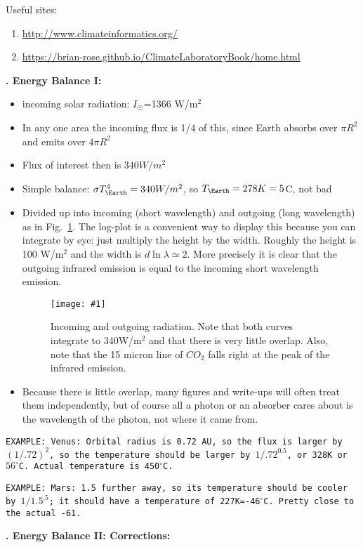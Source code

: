 \documentclass[11pt]{book}
\newcommand{\sfig}[2]{
\texttt{[image: \#1]}
        }
\newcommand{\Spng}[2]{
   \begin{figure}[thbp]
   \begin{center}
    \sfig{../Figures/#1.png}{0.7\columnwidth}
    \caption{{\small #2}}
    \label{fig:#1}
     \end{center}
   \end{figure}
}
\newcommand{\rf}[1]{\ref{fig:#1}}
\newcommand\example[1]{{\tt EXAMPLE: #1}}
\newcommand\bei{\begin{itemize}}
\newcommand\eei{\end{itemize}}
\newcommand\bee{\begin{enumerate}}
\newcommand\eee{\end{enumerate}}
\newcounter{lectureno}
\newcounter{secno}
\newcommand\lsection[1]{
\addtocounter{secno}{1}
{\bf \arabic{lectureno}.\alph{secno} #1:}}
\begin{document}
Useful sites:
\bee
\item\href{Cimateinfomatics}{http://www.climateinformatics.org/}
\item\href{The Climate Laboratory}{https://brian-rose.github.io/ClimateLaboratoryBook/home.html}
\eee

\lsection{Energy Balance I}

\bei
\item incoming solar radiation: $I_\Sun$=1366 W/m$^2$
\item In any one area the incoming flux is 1/4 of this, since Earth absorbs over $\pi R^2$ and emits over $4\pi R^2$
\item Flux of interest then is $340 W/m^2$
\item Simple balance: $\sigma T_\Earth^4 = 340 W/m^2$, so $T_\Earth=278K=5$C, not bad
\item Divided up into incoming (short wavelength) and outgoing (long wavelength) as in Fig.~\rf{balance1a}. The log-plot is a convenient way to display this because you can integrate by eye: just multiply the height by the width. Roughly the height is 100 W/m$^2$ and the width is $d\ln\lambda \simeq 2$. More precisely it is clear that the outgoing infrared emission is equal to the incoming short wavelength emission.
\Spng{balance1a}{Incoming and outgoing radiation. Note that both curves integrate to 340W/m$^2$ and that there is very little overlap. Also, note that the 15 micron line of $CO_2$ falls right at the peak of the infrared emission.}
\item Because there is little overlap, many figures and write-ups will often treat them independently, but of course all a photon or an absorber cares about is the wavelength of the photon, not where it came from.
\eei 

\example{Venus: Orbital radius is 0.72 AU, so the flux is larger by $(1/.72)^2$, so the temperature should be larger by $1/.72^{0.5}$, or 328K or $56^\circ$C. Actual temperature is 450$^\circ$C.}

\example{Mars: 1.5 further away, so its temperature should be cooler by $1/1.5^{.5}$; it should have a temperature of 227K=-46$^\circ$C. Pretty close to the actual -61.}

\lsection{Energy Balance II: Corrections}
\end{document}
